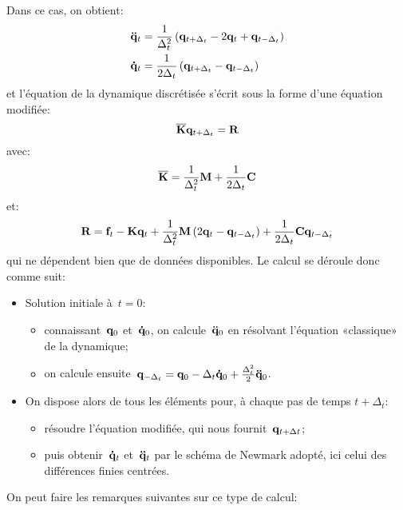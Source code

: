 Dans ce cas, on obtient:
\begin{equation}\colorgreen
\begin{aligned}
&\VV{\ddot q}_t = \frac1{\Delta_t^2} \left( \VV{q}_{t+\Delta_t} - 2\VV{q}_t + \VV{q}_{t-\Delta_t}\right)\\
&\VV{\dot q}_t = \frac1{2\Delta_t}\left( \VV{q}_{t+\Delta_t} - \VV{q}_{t-\Delta_t}\right)
\end{aligned}
\end{equation}
et l'équation de la dynamique discrétisée s'écrit sous la forme d'une équation modifiée:
\begin{equation}\colorblue
\MM{\overline{K}} \VV{q}_{t+\Delta_t} = \VV{R}
\end{equation}
avec:
\begin{equation}\colorgreen
\MM{\overline{K}} = \frac1{\Delta_t^2}\MM{M}+\frac1{2\Delta_t}\MM{C}
\end{equation}
et:
\begin{equation}\colorgreen
\VV{R} = \VV{f}_t -\MM{K}\VV{q}_t + \frac1{\Delta_t^2}\MM{M}\left( 2\VV{q}_t -\VV{q}_{t-\Delta_t}\right)
+\frac1{2\Delta_t}\MM{C}\VV{q}_{t-\Delta_t}
\end{equation}
qui ne dépendent bien que de données disponibles.
\bigskip
Le calcul se déroule donc comme suit:
\begin{itemize}
  \item Solution initiale à~$t=0$:
	\begin{itemize}
	\item connaissant~$\VV{q}_0$ et~$\VV{\dot q}_0$, on calcule~$\VV{\ddot q}_0$ en résolvant
	l'équation «classique» de la dynamique;
	\item on calcule ensuite~$\VV{q}_{-\Delta_t} = \VV{q}_0 -\Delta_t \VV{\dot q}_0 + \frac{\Delta_t^2}2
	\VV{\ddot q}_0$.
	\end{itemize}
  \item On dispose alors de tous les éléments pour, à chaque pas de temps
	$t+\Delta_t$:
	\begin{itemize}
	\item résoudre l'équation modifiée, qui nous fournit~$\VV{q}_{t+\Delta t}$;
	\item puis obtenir~$\VV{\dot q}_t$ et~$\VV{\ddot q}_t$ par le schéma de Newmark adopté,
	ici celui des différences finies centrées.
	\end{itemize}
\end{itemize}
\bigskip
On peut faire les remarques suivantes sur ce type de calcul:

